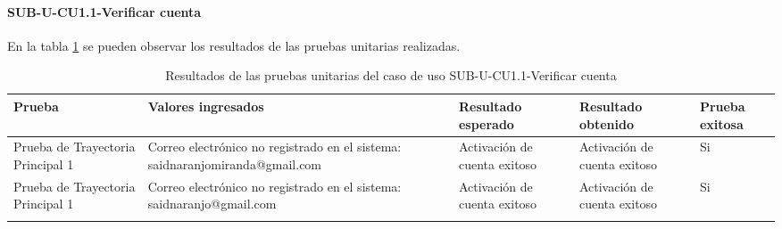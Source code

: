 \paragraph{SUB-U-CU1.1-Verificar cuenta}\label{SUB-U-CU1.1:Pruebas}
En la tabla \ref{pruebas_unitarias_sub-u-cu1.1} se pueden observar los resultados de las pruebas unitarias realizadas.
\begin{longtable}{|M{2cm}| M{4.5cm}|M{3cm}|M{3cm}|M{1.5cm}|}
	\hline
	\textbf{Prueba} & \textbf{Valores ingresados} & \textbf{Resultado esperado} & \textbf{Resultado obtenido} & \textbf{Prueba exitosa} \\ \hline
	Prueba de Trayectoria Principal 1& Correo electrónico no registrado en el sistema: saidnaranjomiranda@gmail.com
	& Activación de cuenta exitoso
	& Activación de cuenta exitoso & Si \\ \hline

	Prueba de Trayectoria Principal 1& Correo electrónico no registrado en el sistema: saidnaranjo@gmail.com
	& Activación de cuenta exitoso
	& Activación de cuenta exitoso & Si \\ \hline

	\caption{Resultados de las pruebas unitarias del caso de uso SUB-U-CU1.1-Verificar cuenta}
	\label{pruebas_unitarias_sub-u-cu1.1}
\end{longtable}